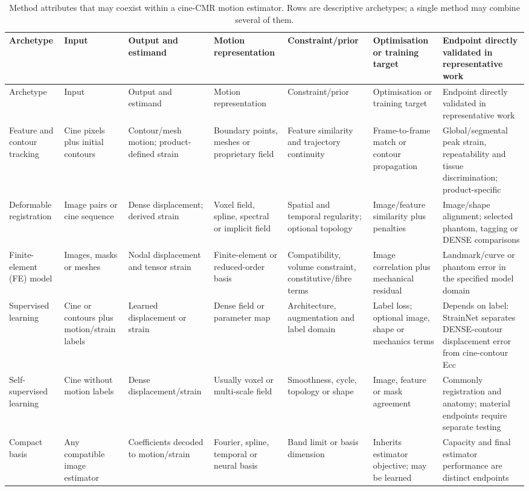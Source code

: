 {\scriptsize\sloppy
\setlength{\tabcolsep}{3pt}
\begin{longtable}{L{0.102\textwidth}L{0.131\textwidth}L{0.125\textwidth}L{0.119\textwidth}L{0.131\textwidth}L{0.125\textwidth}L{0.165\textwidth}}
\caption{Method attributes that may coexist within a cine-CMR motion estimator. Rows are descriptive archetypes; a single method may combine several of them.}\label{tab:families}\\
\toprule
Archetype & Input & Output and estimand & Motion representation & Constraint/prior & Optimisation or training target & Endpoint directly validated in representative work \\
\midrule
\endfirsthead
\toprule
Archetype & Input & Output and estimand & Motion representation & Constraint/prior & Optimisation or training target & Endpoint directly validated in representative work \\
\midrule
\endhead
Feature and contour tracking & Cine pixels plus initial contours & Contour/mesh motion; product-defined strain & Boundary points, meshes or proprietary field & Feature similarity and trajectory continuity & Frame-to-frame match or contour propagation & Global/segmental peak strain, repeatability and tissue discrimination; product-specific \\
\addlinespace
Deformable registration & Image pairs or cine sequence & Dense displacement; derived strain & Voxel field, spline, spectral or implicit field & Spatial and temporal regularity; optional topology & Image/feature similarity plus penalties & Image/shape alignment; selected phantom, tagging or DENSE comparisons \\
\addlinespace
Finite-element (FE) model & Images, masks or meshes & Nodal displacement and tensor strain & Finite-element or reduced-order basis & Compatibility, volume constraint, constitutive/fibre terms & Image correlation plus mechanical residual & Landmark/curve or phantom error in the specified model domain \\
\addlinespace
Supervised learning & Cine or contours plus motion/strain labels & Learned displacement or strain & Dense field or parameter map & Architecture, augmentation and label domain & Label loss; optional image, shape or mechanics terms & Depends on label: StrainNet separates DENSE-contour displacement error from cine-contour Ecc \\
\addlinespace
Self-supervised learning & Cine without motion labels & Dense displacement/strain & Usually voxel or multi-scale field & Smoothness, cycle, topology or shape & Image, feature or mask agreement & Commonly registration and anatomy; material endpoints require separate testing \\
\addlinespace
Compact basis & Any compatible image estimator & Coefficients decoded to motion/strain & Fourier, spline, temporal or neural basis & Band limit or basis dimension & Inherits estimator objective; may be learned & Capacity and final estimator performance are distinct endpoints \\
\bottomrule
\end{longtable}
}

